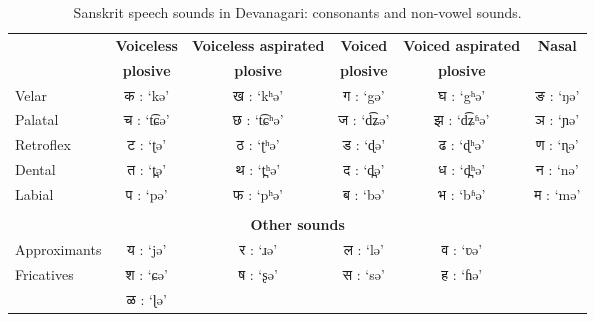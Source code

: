 \documentclass[10pt,a4paper]{article}
\begin{document}
\begin{table*}[ht]
	
	\begin{center}
		\begin{tabular}{|l|c|c|c|c|c|}
			\hline
			 & \textbf{Voiceless }&\textbf{Voiceless aspirated }&\textbf{Voiced }&\textbf{Voiced aspirated }&\textbf{Nasal}\\
			& \textbf{ plosive}&\textbf{ plosive}&\textbf{ plosive}&\textbf{ plosive}&\textbf{}
			\\
			\hline			
			Velar&क : `kə'	&ख : `kʰə'&	ग : `gə'&	घ : `gʰə'& ङ : `ŋə'\\\hline
			Palatal& च : `t͡ɕə'&	छ : `t͡ɕʰə'& ज : `d͡ʑə'&	झ : `d͡ʑʱə'& ञ : `ɲə'\\\hline
			Retroflex& ट : `ʈə'&	ठ : `ʈʰə'& 	ड : `ɖə'& ढ : `ɖʰə'&	ण : `ɳə'\\\hline
			Dental& त : `t̪ə'& 	थ : `t̪ʰə'&	द : `d̪ə'&		ध : `d̪ʰə'& न : `nə'\\\hline
			Labial & प : `pə'& 	फ : `pʰə'& ब : `bə'& 	भ : `bʱə'& म : `mə'\\\hline
			\multicolumn{6}{c}{ }\\\hline
			\multicolumn{6}{|c|}{\textbf{Other sounds}}\\\hline\hline
			Approximants& य : `jə'& 	र : `ɹə'&	ल : `lə'&	व : `ʋə'&\\\hline Fricatives&श : `ɕə'& ष : `ʂə'& 		स : `sə'& 	ह : `ɦə'&\\\hline&
			ळ : `ɭə'&\multicolumn{4}{c|}{ }	%
			\\\hline
		\end{tabular}
		\caption{Sanskrit speech sounds in Devanagari: consonants and non-vowel sounds.}
	\end{center}
	\label{cons}
\end{table*}
\end{document}
